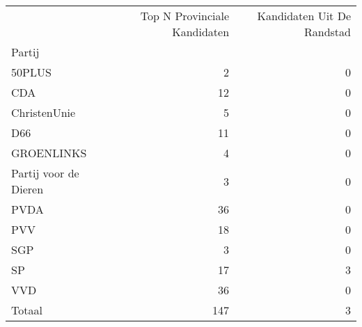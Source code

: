 \begin{tabular}{lrr}
\toprule
{} &  Top N Provinciale Kandidaten &  Kandidaten Uit De Randstad \\
Partij                &                               &                             \\
\midrule
50PLUS                &                             2 &                         0 \\
CDA                   &                            12 &                         0 \\
ChristenUnie          &                             5 &                         0 \\
D66                   &                            11 &                         0 \\
GROENLINKS            &                             4 &                         0 \\
Partij voor de Dieren &                             3 &                         0 \\
PVDA                  &                            36 &                         0 \\
PVV                   &                            18 &                         0 \\
SGP                   &                             3 &                         0 \\
SP                    &                            17 &                         3 \\
VVD                   &                            36 &                         0 \\
\midrule
Totaal & 147& 3\\

\bottomrule
\end{tabular}
